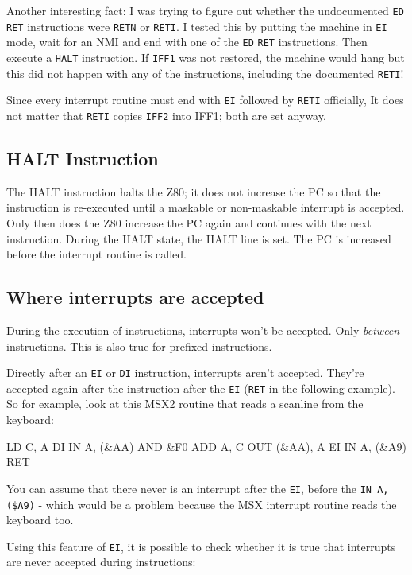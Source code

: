 Another interesting fact: I was trying to figure out whether the undocumented {\tt ED} {\tt RET} instructions were {\tt RETN} or {\tt RETI}. I tested this by putting the machine in {\tt EI} mode, wait for an NMI and end with one of the {\tt ED} {\tt RET} instructions. Then execute a {\tt HALT} instruction. If {\tt IFF1} was not restored, the machine would hang but this did not happen with any of the instructions, including the documented {\tt RETI}!

Since every interrupt routine must end with {\tt EI} followed by {\tt RETI} officially, It does not matter that {\tt RETI} copies {\tt IFF2} into IFF1; both are set anyway.


\subsection{HALT Instruction}

The HALT instruction halts the Z80; it does not increase the PC so that the instruction is re-executed until a maskable or non-maskable interrupt is accepted. Only then does the Z80 increase the PC again and continues with the next instruction. During the HALT state, the HALT line is set. The PC is increased before the interrupt routine is called.


\subsection{Where interrupts are accepted}

During the execution of instructions, interrupts won't be accepted. Only {\em between} instructions. This is also true for prefixed instructions.

Directly after an {\tt EI} or {\tt DI} instruction, interrupts aren't accepted. They're accepted again after the instruction after the {\tt EI} ({\tt RET} in the following example). So for example, look at this MSX2 routine that reads a scanline from the keyboard:

\begin{tcblisting}{}
	LD C, A
	DI
	IN A, (&AA)
	AND &F0
	ADD A, C
	OUT (&AA), A
	EI
	IN A, (&A9)
	RET
\end{tcblisting}

You can assume that there never is an interrupt after the {\tt EI}, before the {\tt IN A,(\$A9)} - which would be a problem because the MSX interrupt routine reads the keyboard too.

\pagebreak %
Using this feature of {\tt EI}, it is possible to check whether it is true that interrupts are never accepted during instructions:

